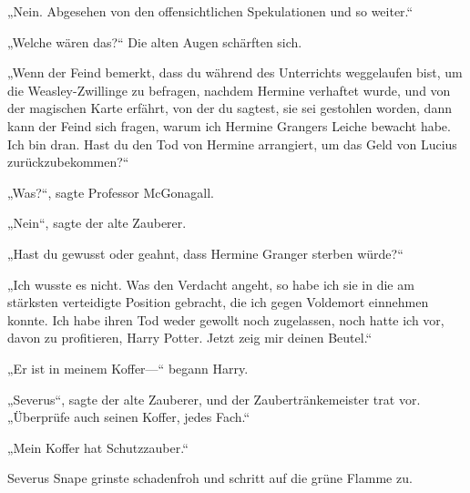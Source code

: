 „Nein. Abgesehen von den offensichtlichen Spekulationen und so weiter.“

„Welche wären das?“
Die alten Augen schärften sich.

„Wenn der Feind bemerkt, dass du während des Unterrichts weggelaufen bist, um die Weasley-Zwillinge zu befragen, nachdem Hermine verhaftet wurde, und von der magischen Karte erfährt, von der du sagtest, sie sei gestohlen worden, dann kann der Feind sich fragen, warum ich Hermine Grangers Leiche bewacht habe. Ich bin dran. Hast du den Tod von Hermine arrangiert, um das Geld von Lucius zurückzubekommen?“

„Was?“, sagte Professor McGonagall.

„Nein“, sagte der alte Zauberer.

„Hast du gewusst oder geahnt, dass Hermine Granger sterben würde?“

„Ich wusste es nicht. Was den Verdacht angeht, so habe ich sie in die am stärksten verteidigte Position gebracht, die ich gegen Voldemort einnehmen konnte. Ich habe ihren Tod weder gewollt noch zugelassen, noch hatte ich vor, davon zu profitieren, Harry Potter. Jetzt zeig mir deinen Beutel.“

„Er ist in meinem Koffer—“ begann Harry.

„Severus“, sagte der alte Zauberer, und der Zaubertränkemeister trat vor. „Überprüfe auch seinen Koffer, jedes Fach.“

„Mein Koffer hat Schutzzauber.“

Severus Snape grinste schadenfroh und schritt auf die grüne Flamme zu.


